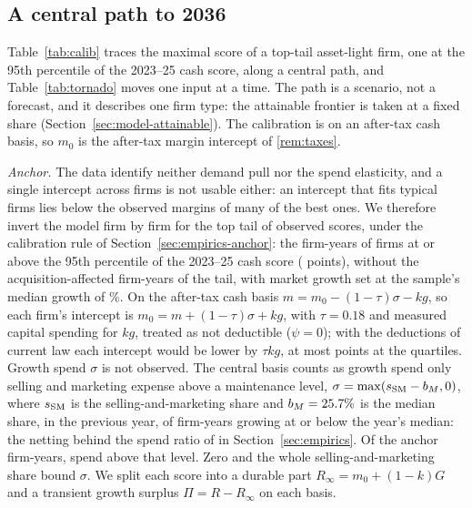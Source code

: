 \subsection{A central path to 2036}\label{sec:horizons-ranges}
Table~\ref{tab:calib} traces the maximal score of a top-tail asset-light firm, one at the 95th percentile of the 2023--25 cash score, along a central path, and Table~\ref{tab:tornado} moves one input at a time. The path is a scenario, not a forecast, and it describes one firm type: the attainable frontier is taken at a fixed share (Section~\ref{sec:model-attainable}). The calibration is on an after-tax cash basis, so $m_0$ is the after-tax margin intercept of \autoref{rem:taxes}.

\emph{Anchor.} The data identify neither demand pull nor the spend elasticity, and a single intercept across firms is not usable either: an intercept that fits typical firms lies below the observed margins of many of the best ones. We therefore invert the model firm by firm for the top tail of observed scores, under the calibration rule of Section~\ref{sec:empirics-anchor}: the \AnchorN{} firm-years of \AnchorFirms{} firms at or above the 95th percentile of the 2023--25 cash score (\AnchorPthree{} points), without the \AnchorAcqExcl{} acquisition-affected firm-years of the tail, with market growth set at the sample's median growth of \AnchorG\%. On the after-tax cash basis $m=m_0-(1-\tau)\sigma-kg$, so each firm's intercept is $m_0=m+(1-\tau)\sigma+kg$, with $\tau=0.18$ and measured capital spending for $kg$, treated as not deductible ($\psi=0$); with the deductions of current law each intercept would be lower by $\tau kg$, at most \AnchorTaxGap{} points at the quartiles. Growth spend $\sigma$ is not observed. The central basis counts as growth spend only selling and marketing expense above a maintenance level, $\sigma=\max(s_{\rm SM}-b_M,0)$, where $s_{\rm SM}$ is the selling-and-marketing share and $b_M=25.7\%$ is the median share, in the previous year, of firm-years growing at or below the year's median: the netting behind the spend ratio of \AlphaNet{} in Section~\ref{sec:empirics}. Of the \AnchorN{} anchor firm-years, \AnchorSmAboveBase{} spend above that level. Zero and the whole selling-and-marketing share bound $\sigma$. We split each score into a durable part $R_\infty=m_0+(1-k)G$ and a transient growth surplus $\Pi=R-R_\infty$ on each basis.

